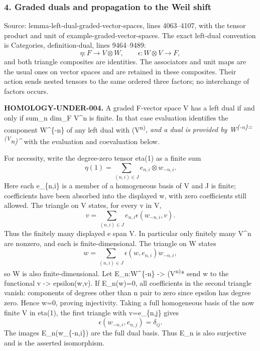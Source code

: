 \documentclass[11pt]{article}
\begin{document}
\subsubsection{4. Graded duals and propagation to the Weil shift}\label{graded-duals-and-propagation-to-the-weil-shift}

Source: lemma-left-dual-graded-vector-spaces, lines 4063--4107, with the tensor product and unit of example-graded-vector-spaces. The exact left-dual convention is Categories, definition-dual, lines 9464--9489: \[
\eta:F\longrightarrow V\otimes W,\qquad
\epsilon:W\otimes V\longrightarrow F,
\] and both triangle composites are identities. The associators and unit maps are the usual ones on vector spaces and are retained in these composites. Their action sends nested tensors to the same ordered three factors; no interchange of factors occurs.

\textbf{HOMOLOGY-UNDER-004.} A graded F-vector space V has a left dual if and only if sum\_n dim\_F V\^{}n is finite. In that case evaluation identifies the component W\^{}\{-n\} of any left dual with (V\textsuperscript{n)}\emph{, and a dual is provided by W\textsuperscript{\{-n\}=(V}n)\^{}} with the evaluation and coevaluation below.

For necessity, write the degree-zero tensor eta(1) as a finite sum \[
\eta(1)=\sum_{(n,i)\in J} e_{n,i}\otimes w_{-n,i}.
\] Here each e\_\{n,i\} is a member of a homogeneous basis of V and J is finite; coefficients have been absorbed into the displayed w, with zero coefficients still allowed. The triangle on V states, for every v in V, \[
v=\sum_{(n,i)\in J}e_{n,i}\epsilon(w_{-n,i},v).
\] Thus the finitely many displayed e span V. In particular only finitely many V\^{}n are nonzero, and each is finite-dimensional. The triangle on W states \[
w=\sum_{(n,i)\in J}\epsilon(w,e_{n,i})w_{-n,i},
\] so W is also finite-dimensional. Let E\_n:W\^{}\{-n\} -\textgreater{} (V\textsuperscript{n)}* send w to the functional v -\textgreater{} epsilon(w,v). If E\_n(w)=0, all coefficients in the second triangle vanish: components of degrees other than n pair to zero since epsilon has degree zero. Hence w=0, proving injectivity. Taking a full homogeneous basis of the now finite V in eta(1), the first triangle with v=e\_\{n,j\} gives \[
\epsilon(w_{-n,i},e_{n,j})=\delta_{ij}.
\] The images E\_n(w\_\{-n,i\}) are the full dual basis. Thus E\_n is also surjective and is the asserted isomorphism.
\end{document}
